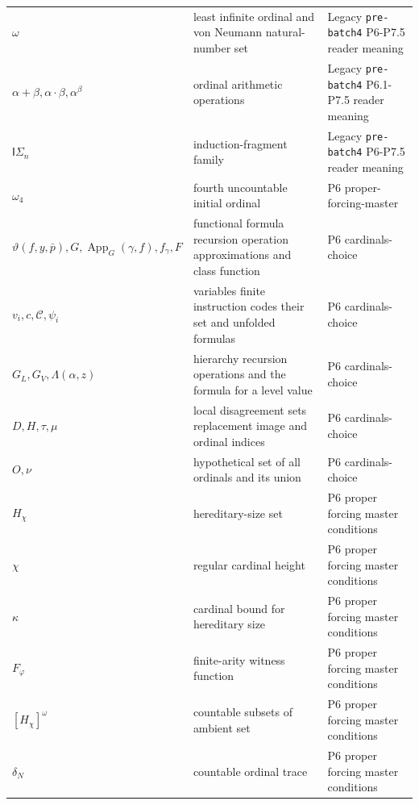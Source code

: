 \begin{longtable}{@{}p{}p{}p{}@{}}
\(\omega\) & least infinite ordinal and von Neumann natural-number set & Legacy \texttt{pre-\allowbreak{}batch4} P6-\allowbreak{}P7.\allowbreak{}5 reader meaning \\
\(\alpha+\beta,\allowbreak \alpha\cdot\beta,\allowbreak \alpha^\beta\) & ordinal arithmetic operations & Legacy \texttt{pre-\allowbreak{}batch4} P6.\allowbreak{}1-\allowbreak{}P7.\allowbreak{}5 reader meaning \\
\(\mathsf I\Sigma_n\) & induction-fragment family & Legacy \texttt{pre-\allowbreak{}batch4} P6-\allowbreak{}P7.\allowbreak{}5 reader meaning \\
\(\omega_4\) & fourth uncountable initial ordinal & P6 proper-\allowbreak{}forcing-\allowbreak{}master \\
\(\vartheta(f,\allowbreak y,\allowbreak \bar p),\allowbreak G,\allowbreak \operatorname{App}_G(\gamma,\allowbreak f),\allowbreak f_\gamma,\allowbreak F\) & functional formula recursion operation approximations and class function & P6 cardinals-\allowbreak{}choice \\
\(v_i,\allowbreak c,\allowbreak \mathcal C,\allowbreak \psi_i\) & variables finite instruction codes their set and unfolded formulas & P6 cardinals-\allowbreak{}choice \\
\(G_L,\allowbreak G_V,\allowbreak \Lambda(\alpha,\allowbreak z)\) & hierarchy recursion operations and the formula for a level value & P6 cardinals-\allowbreak{}choice \\
\(D,\allowbreak H,\allowbreak \tau,\allowbreak \mu\) & local disagreement sets replacement image and ordinal indices & P6 cardinals-\allowbreak{}choice \\
\(O,\allowbreak \nu\) & hypothetical set of all ordinals and its union & P6 cardinals-\allowbreak{}choice \\
\(H_\chi\) & hereditary-size set & P6 proper forcing master conditions \\
\(\chi\) & regular cardinal height & P6 proper forcing master conditions \\
\(\kappa\) & cardinal bound for hereditary size & P6 proper forcing master conditions \\
\(F_\varphi\) & finite-arity witness function & P6 proper forcing master conditions \\
\([H_\chi]^\omega\) & countable subsets of ambient set & P6 proper forcing master conditions \\
\(\delta_N\) & countable ordinal trace & P6 proper forcing master conditions \\

\end{longtable}
